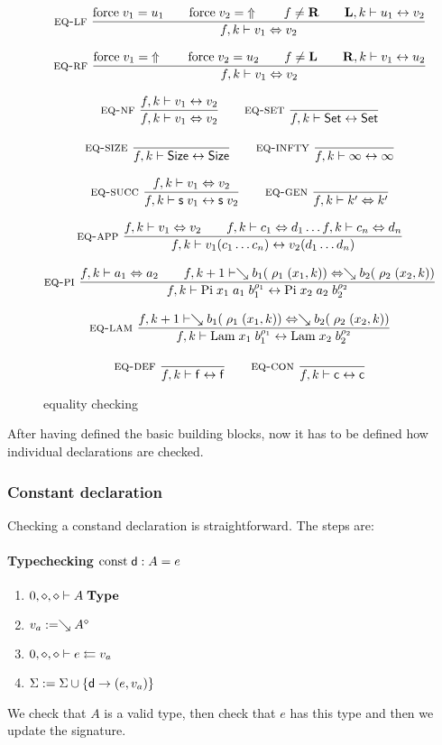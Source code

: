 \begin{figure}[p]
\begin{gather*}
\nru{\eqlf}
{\forc \; v_1 = u_1 \qquad \forc \; v_2 = \stuck 
\qquad
f \neq \rF \qquad \FeqVal{\lF}{k}{u_1}{v_2}}
{ \EqVal{f}{k}{v_1}{v_2}}
\\[2ex]
\nru{\eqrf}
{\forc \; v_1 = \stuck \qquad \forc \; v_2 = u_2 
\qquad
f \neq \lF \qquad \FeqVal{\rF}{k}{v_1}{u_2}}
{ \EqVal{f}{k}{v_1}{v_2}}
\\[2ex]
\nru{\eqnf}
{\FeqVal{f}{k}{v_1}{v_2}}
{ \EqVal{f}{k}{v_1}{v_2}}
\qquad
\nru{\eqset}
{}
{\FeqVal{f}{k}{\Set}{\Set}}
\\[2ex]
\nru{\eqsize}
{}
{\FeqVal{f}{k}{\Size}{\Size}}
\qquad
\nru{\eqinfty}
{}
{\FeqVal{f}{k}{\infty}{\infty}}
\\[2ex]
\nru{\eqsuc}
{\EqVal{f}{k}{v_1}{v_2}}
{\FeqVal{f}{k}{\s v_1}{\s v_2}}
\qquad
\nru{\eqgen}
{}
{\EqVal{f}{k}{k'}{k'}}
\\[2ex]
\nru{\eqapp}
{\EqVal{f}{k}{v_1}{v_2} \qquad
\EqVal{f}{k}{c_1}{d_1} \ldots \EqVal{f}{k}{c_n}{d_n}}
{\FeqVal{f}{k}{v_1 (c_1 \ldots c_n)}{v_2 (d_1 \ldots d_n)}}
\\[2ex]
\nru{\eqpi}
{\EqVal{f}{k}{a_1}{a_2}
\qquad
\EqVal{f}{k+1}{\wh b_1 (\ins \; \rho_1 \; (x_1,k))}{\wh b_2 (\ins \; \rho_2 \; (x_2,k))}}
{\FeqVal{f}{k}{\vpi \; x_1 \; a_1 \; \cl{b_1}{\rho_1}}{\vpi \; x_2 \; a_2 \; \cl{b_2}{\rho_2}}}
\\[2ex]
\nru{\eqlam}
{\EqVal{f}{k+1}{\wh b_1 (\ins \; \rho_1 \; (x_1,k))}{\wh b_2 (\ins \; \rho_2 \; (x_2,k))}}
{\FeqVal{f}{k}{\vlam \; x_1 \; \cl{b_1}{\rho_1}}{\vlam \; x_2 \; \cl{b_2}{\rho_2}}}
\\[2ex]
\nru{\eqdef}
{}
{\FeqVal{f}{k}{\ff}{\ff}}
\qquad
\nru{\eqcon}
{}
{\FeqVal{f}{k}{\cc}{\cc}}
\end{gather*}
\caption{equality checking}
\end{figure}

After having defined the basic building blocks, now it has to be defined how individual declarations are checked.
\subsubsection{Constant declaration}
Checking a constand declaration is straightforward.
The steps are:
\paragraph*{Typechecking $\const \dd : A = e $}
\begin{enumerate}
\item
$\IsType{0}{\diamond}{\diamond}{A}$
\item
$ v_a := \wh \cl{A}{\diamond}$
\item
$\Check{0}{\diamond}{\diamond}{e}{v_a}$
\item
$\Sig := \Sig \cup \{\dd \ra (e,v_a)\}$
\end{enumerate}
We check that $A$ is a valid type, then check that $e$ has this type and then we update the signature.
